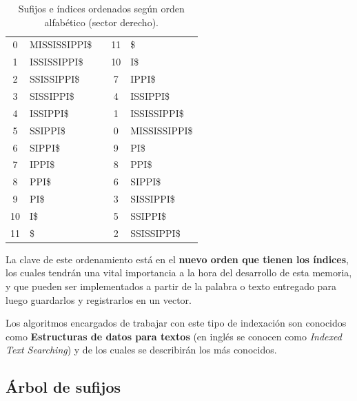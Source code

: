 \begin{table}[h]
	\centering
	\label{my-label8}
	\begin{tabular}{c l c c l}
		0 & MISSISSIPPI\$ &  & 11 & \$\\
		1 & ISSISSIPPI\$ &  & 10 & I\$\\
		2 & SSISSIPPI\$ &  & 7 & IPPI\$\\
		3 & SISSIPPI\$ &  & 4 & ISSIPPI\$\\
		4 & ISSIPPI\$ &  & 1 & ISSISSIPPI\$\\
		5 & SSIPPI\$ &  & 0 & MISSISSIPPI\$\\
		6 & SIPPI\$ &  & 9 & PI\$\\
		7 & IPPI\$ &  & 8 & PPI\$\\
		8 & PPI\$ &  & 6 & SIPPI\$\\
		9 & PI\$ &  & 3 & SISSIPPI\$\\
		10 & I\$ &  & 5 & SSIPPI\$\\
		11 & \$ &  & 2 & SSISSIPPI\$\\
	\end{tabular}
\caption{Sufijos e índices ordenados según orden alfabético (sector derecho).}
\end{table}

La clave de este ordenamiento está en el \textbf{nuevo orden que tienen los índices}, los cuales tendrán una vital importancia a la hora del desarrollo de esta memoria, y que pueden ser implementados a partir de la palabra o texto entregado para luego guardarlos y registrarlos en un vector.

Los algoritmos encargados de trabajar con este tipo de indexación son conocidos como \textbf{Estructuras de datos para textos} (en inglés se conocen como \textit{Indexed Text Searching}) y de los cuales se describirán los más conocidos.

\subsection{Árbol de sufijos}


